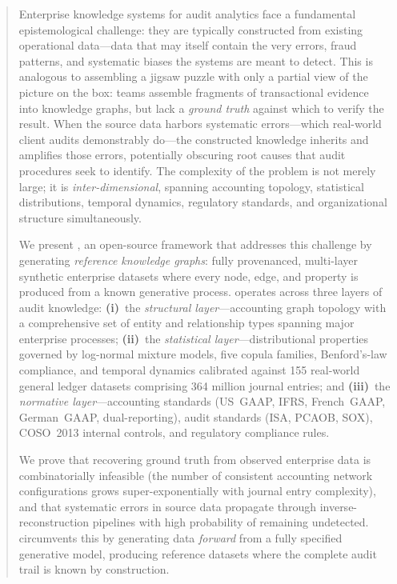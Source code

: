 \begin{abstract}
Enterprise knowledge systems for audit analytics face a fundamental
epistemological challenge: they are typically constructed from existing
operational data---data that may itself contain the very errors, fraud
patterns, and systematic biases the systems are meant to detect.  This is
analogous to assembling a jigsaw puzzle with only a partial view of the picture
on the box: teams assemble fragments of transactional evidence into
knowledge graphs, but lack a \emph{ground truth} against which to verify
the result.  When the source data harbors systematic errors---which
real-world client audits demonstrably do---the constructed knowledge
inherits and amplifies those errors, potentially obscuring root causes that audit procedures seek to identify.  The complexity of the problem is not merely
large; it is \emph{inter-dimensional}, spanning accounting topology,
statistical distributions, temporal dynamics, regulatory standards, and
organizational structure simultaneously.

We present \system{}, an open-source framework that addresses this
challenge by generating \emph{reference knowledge graphs}: fully
provenanced, multi-layer synthetic enterprise datasets where every node,
edge, and property is produced from a known generative process.
\system{} operates across three layers of audit knowledge:
\textbf{(i)}~the \emph{structural layer}---accounting graph topology
with a comprehensive set of entity and relationship types spanning
major enterprise processes;
\textbf{(ii)}~the \emph{statistical layer}---distributional properties
governed by log-normal mixture models, five copula families, Benford's-law
compliance, and temporal dynamics calibrated against 155 real-world general
ledger datasets comprising 364 million journal entries; and
\textbf{(iii)}~the \emph{normative layer}---accounting standards
(US~GAAP, IFRS, French~GAAP, German~GAAP, dual-reporting), audit standards
(ISA, PCAOB, SOX), COSO~2013 internal controls, and regulatory
compliance rules.

We prove that recovering ground truth from observed enterprise data is
combinatorially infeasible (the number of consistent accounting
network configurations grows super-exponentially with journal entry
complexity), and that systematic errors in source data propagate
through inverse-reconstruction pipelines with high probability of
remaining undetected.  \system{} circumvents this by generating data
\emph{forward} from a fully specified generative model, producing
reference datasets where the complete audit trail is known by
construction.


\end{abstract}
